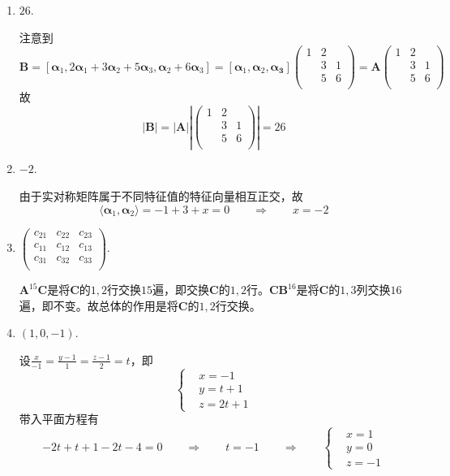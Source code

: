 \begin{enumerate}
    \item \(26\).\[\]

    注意到\[\boldsymbol{B} = [\boldsymbol{\alpha}_1, 2\boldsymbol{\alpha}_1 + 3 \boldsymbol{\alpha}_2 + 5\boldsymbol{\alpha}_3 , \boldsymbol{\alpha}_2 + 6 \boldsymbol{\alpha}_3] = [\boldsymbol{\alpha}_1, \boldsymbol{\alpha}_2 , \boldsymbol{\alpha_3}] \begin{pmatrix}
        1 & 2 &  \\ & 3 & 1 \\ & 5 & 6\\
    \end{pmatrix} = \boldsymbol{A}\begin{pmatrix}
        1 & 2 &  \\ & 3 & 1 \\ & 5 & 6\\
    \end{pmatrix}\]
    故\[|\boldsymbol{B}| = |\boldsymbol{A}| \left|\begin{pmatrix}
        1 & 2 &  \\ & 3 & 1 \\ & 5 & 6\\
    \end{pmatrix}\right| = 26\]

    \item \(-2\).\[\]
    
    由于实对称矩阵属于不同特征值的特征向量相互正交，故\[\langle \boldsymbol{\alpha}_1, \boldsymbol{\alpha}_2 \rangle = - 1+ 3 + x = 0\qquad \Longrightarrow\qquad x = -2\]

    \item \(\displaystyle \begin{pmatrix}
        c_{21} & c_{22} & c_{23} \\ 
        c_{11} & c_{12} & c_{13} \\ 
        c_{31} & c_{32} & c_{33} \\ 
    \end{pmatrix}   .
    \)\[\]
    
    \(\boldsymbol{A}^{15}\boldsymbol{C}\)是将\(\boldsymbol{C}\)的\(1,2\)行交换\(15\)遍，即交换\(\boldsymbol{C}\)的\(1, 2\)行。\(\boldsymbol{CB}^{16}\)是将\(\boldsymbol{C}\)的\(1,3\)列交换\(16\)遍，即不变。故总体的作用是将\(\boldsymbol{C}\)的\(1,2\)行交换。

    \item \((1, 0, -1)\).\[\]

    设\(\displaystyle \frac{x}{-1} = \frac{y - 1}{1} = \frac{z - 1}{2} = t\)，即\[\left\{\begin{aligned}
        &x = -1 \\ &y = t + 1 \\ &z = 2t + 1
    \end{aligned}\right.\]
    带入平面方程有\[-2t + t + 1 - 2t - 4 = 0 \qquad \Longrightarrow\qquad t = -1 \qquad \Longrightarrow\qquad \left\{\begin{aligned}
        &x = 1 \\ &y = 0 \\ &z = -1
    \end{aligned}\right.\]


\end{enumerate}
